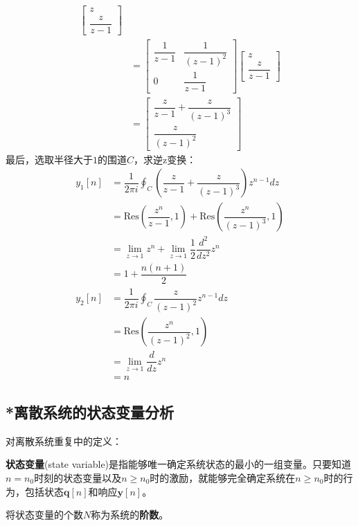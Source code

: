\begin{example}
\begin{align*}
\begin{bmatrix}
            z\\
            \dfrac{z}{z-1}
        \end{bmatrix}\\
        & = \begin{bmatrix}
            \dfrac{1}{z-1} & \dfrac{1}{(z-1)^2}\\
            0 & \dfrac{1}{z-1}
        \end{bmatrix} \begin{bmatrix}
            z\\
            \dfrac{z}{z-1}
        \end{bmatrix}\\
        & = \begin{bmatrix}
            \dfrac{z}{z-1} + \dfrac{z}{(z-1)^3}\\
            \dfrac{z}{(z-1)^2}
        \end{bmatrix}
    \end{align*}
    最后，选取半径大于$1$的围道$C$，求逆z变换：\begin{align*}
        y_1[n] & = \dfrac{1}{2\pi i} \oint_C \left(\dfrac{z}{z-1} + \dfrac{z}{(z-1)^3}\right) z^{n-1} dz\\
        & = \mathrm{Res}\left(\dfrac{z^n}{z-1},1\right) + \mathrm{Res}\left(\dfrac{z^n}{(z-1)^3},1\right)\\
        &=\lim_{z\to 1}z^n+ \lim_{z\to 1} \dfrac{1}{2}\dfrac{d^2}{dz^2}z^n\\
        & = 1 + \dfrac{n(n+1)}{2}\\
        y_2[n] & = \dfrac{1}{2\pi i} \oint_C \dfrac{z}{(z-1)^2} z^{n-1} dz\\
        & = \mathrm{Res}\left(\dfrac{z^n}{(z-1)^2},1\right)\\
        &=\lim_{z\to 1} \dfrac{d}{dz} z^n\\
        & = n
    \end{align*}
\end{example}

\subsection{*离散系统的状态变量分析}\label{sub:discrete_state_variable}

对离散系统重复中的定义：

\begin{definition}[状态变量]
    \textbf{状态变量}(state variable)是指能够唯一确定系统状态的最小的一组变量。只要知道$n=n_0$时刻的状态变量以及$n\geq n_0$时的激励，就能够完全确定系统在$n\geq n_0$时的行为，包括状态$\mathbf{q}[n]$和响应$\mathbf{y}[n]$。

    将状态变量的个数$N$称为系统的\textbf{阶数}。
\end{definition}

